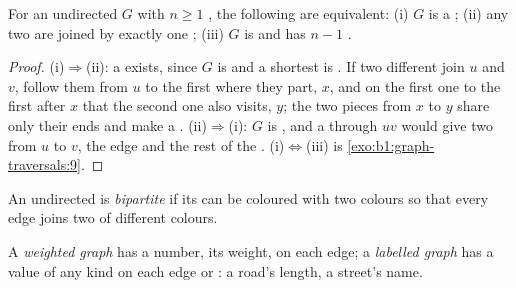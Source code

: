 \begin{proposition}\label{prop:b1:graph-traversals:free-tree}
For an undirected  $G$ with $n \geq 1$ , the following are equivalent: (i) $G$ is a ; (ii) any
two  are joined by exactly one ; (iii) $G$ is  and has $n - 1$ .
\end{proposition}

\begin{proof}
(i)$\Rightarrow$(ii): a  exists, since $G$ is  and a shortest  is . If two different  join $u$ and $v$, follow them from $u$ to the first  where they part, $x$, and on the first one to the
first  after $x$ that the second one also visits, $y$; the two pieces from $x$ to $y$ share only their ends and
make a . (ii)$\Rightarrow$(i): $G$ is , and a  through $u v$ would give two  from $u$
to $v$, the edge and the rest of the . (i)$\Leftrightarrow$(iii) is \cref{exo:b1:graph-traversals:9}.
\end{proof}

\begin{definition}\label{def:b1:graph-traversals:bipartite}
An undirected  is \emph{bipartite} if its  can be coloured with two colours so that
every edge joins two  of different colours.
\end{definition}

\begin{definition}\label{def:b1:graph-traversals:weighted}
A \emph{weighted graph} has a number, its weight, on each edge; a \emph{labelled
graph} has a value of any kind on each edge or : a road's length, a street's name.
\end{definition}

